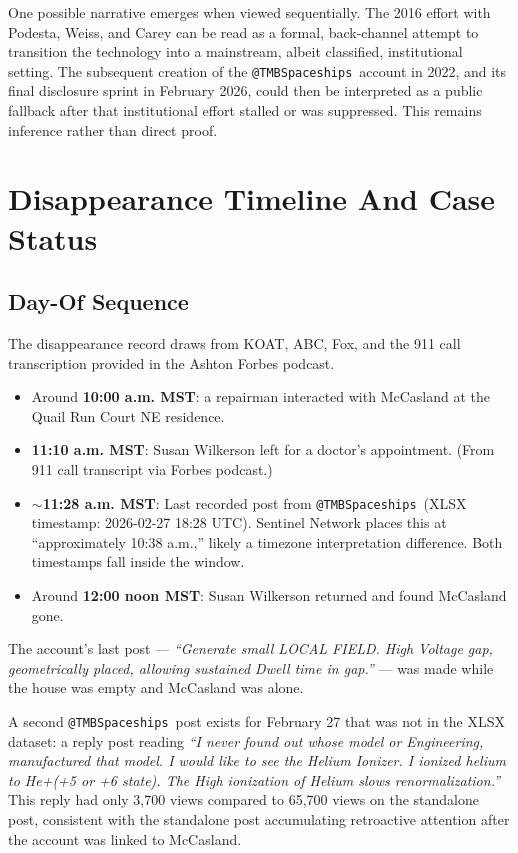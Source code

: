 \documentclass[11pt]{article}
\makeatletter
\newcommand{\account}{\texttt{@TMBSpaceships}}
\makeatother
\begin{document}
One possible narrative emerges when viewed sequentially. The 2016 effort with Podesta, Weiss, and Carey can be read as a formal, back-channel attempt to transition the technology into a mainstream, albeit classified, institutional setting. The subsequent creation of the \account\ account in 2022, and its final disclosure sprint in February 2026, could then be interpreted as a public fallback after that institutional effort stalled or was suppressed. This remains inference rather than direct proof.

\section{Disappearance Timeline And Case Status}

\subsection{Day-Of Sequence}

The disappearance record draws from KOAT, ABC, Fox, and the 911 call transcription provided in the Ashton Forbes podcast.

\begin{itemize}
  \item Around \textbf{10:00 a.m. MST}: a repairman interacted with McCasland at the Quail Run Court NE residence.
  \item \textbf{11:10 a.m. MST}: Susan Wilkerson left for a doctor's appointment. (From 911 call transcript via Forbes podcast.)
  \item \textbf{$\sim$11:28 a.m. MST}: Last recorded post from \account\ (XLSX timestamp: 2026-02-27 18:28 UTC). Sentinel Network places this at ``approximately 10:38 a.m.,'' likely a timezone interpretation difference. Both timestamps fall inside the window.
  \item Around \textbf{12:00 noon MST}: Susan Wilkerson returned and found McCasland gone.
\end{itemize}

The account's last post — \emph{``Generate small LOCAL FIELD. High Voltage gap, geometrically placed, allowing sustained Dwell time in gap.''} — was made while the house was empty and McCasland was alone.

A second \account\ post exists for February 27 that was not in the XLSX dataset: a reply post reading \emph{``I never found out whose model or Engineering, manufactured that model. I would like to see the Helium Ionizer. I ionized helium to He+(+5 or +6 state). The High ionization of Helium slows renormalization.''} This reply had only 3{,}700 views compared to 65{,}700 views on the standalone post, consistent with the standalone post accumulating retroactive attention after the account was linked to McCasland.
\end{document}

